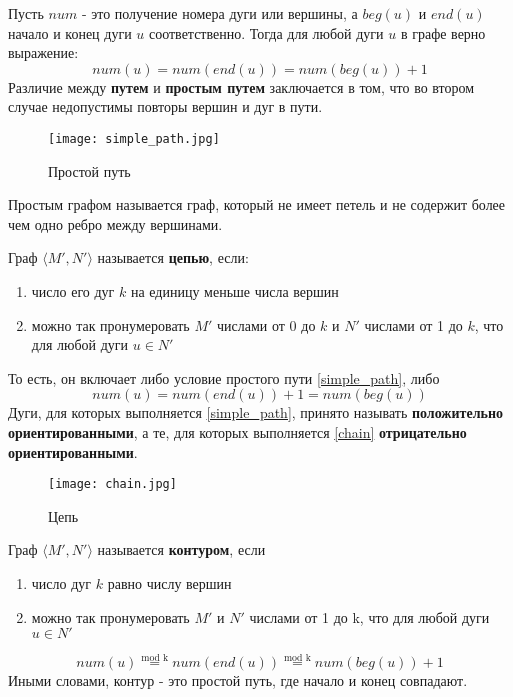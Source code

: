 Пусть $num$ - это получение номера дуги или вершины, а $beg(u)$ и $end(u)$ начало и конец дуги 
$u$ соответственно. Тогда для любой дуги $u$ в графе верно выражение:
\begin{equation}
    \label{simple_path}
    num(u) = num(end(u)) = num(beg(u)) + 1
\end{equation}
Различие между \textbf{путем} и \textbf{простым путем} заключается в том, что во втором случае
недопустимы повторы вершин и дуг в пути.
\begin{figure}[h]
    \centering 
    \texttt{[image: simple\_path.jpg]}
    \caption{Простой путь}
\end{figure}

\begin{thm}
    Простым графом называется граф, который не имеет петель и не содержит более чем одно ребро между вершинами.
\end{thm}
Граф $\langle M', N'\rangle$ называется \textbf{цепью}, если:
\begin{enumerate}
    \item число его дуг $k$ на единицу меньше числа вершин
    \item можно так пронумеровать $M'$ числами от 0 до $k$ и $N'$ числами от 1 до $k$,
    что для любой дуги $u \in N'$
\end{enumerate}
То есть, он включает либо условие простого пути \ref{simple_path}, либо
\begin{equation}
    \label{chain}
    num(u) = num(end(u)) + 1 = num(beg(u))
\end{equation}
Дуги, для которых выполняется \ref{simple_path}, принято называть \textbf{положительно ориентированными},
а те, для которых выполняется \ref{chain} \textbf{отрицательно ориентированными}.

\begin{figure}[h]
    \centering 
    \texttt{[image: chain.jpg]}
    \caption{Цепь}
\end{figure}

Граф $\langle M', N'\rangle$ называется \textbf{контуром}, если
\begin{enumerate}
    \item число дуг $k$ равно числу вершин
    \item можно так пронумеровать $M'$ и $N'$ числами от 1 до k, что для любой
    дуги $u \in N'$
\end{enumerate}
\begin{equation}
    num(u) \stackrel{\text{mod k}}{=} num(end(u)) \stackrel{\text{mod k}}{=} num(beg(u)) + 1
\end{equation}
Иными словами, контур - это простой путь, где начало и конец совпадают.

